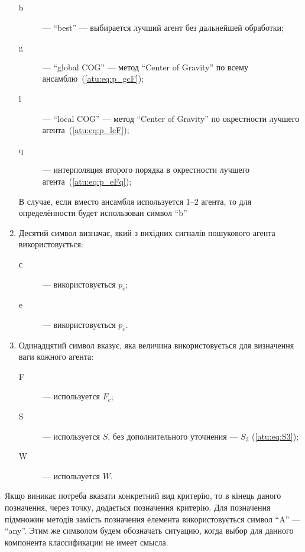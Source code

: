 \begin{enumerate}
\begin{description}
      \item[b]  --- ``best'' ---
        выбирается лучший агент без дальнейшей обработки;

      \item[g]  --- ``global COG'' ---
        метод ``Center of Gravity'' по всему ансамблю~(\ref{atu:eq:p_gcF});

      \item[l] --- ``local COG'' ---
        метод ``Center of Gravity'' по окрестности лучшего агента~(\ref{atu:eq:p_lcF});

      \item[q] ---
        интерполяция второго порядка в окрестности лучшего агента~(\ref{atu:eq:p_eFq});


    \end{description}

    В случае, если вместо ансамбля используется 1--2 агента, то для определённости будет
    использован символ ``b''


  \item
     Десятий символ визначає, який з вихідних сигналів пошукового агента використовується:
    \begin{description}

      \item[с]  ---  використовується $p_c$;

      \item[e]  --- використовується $p_e$.

    \end{description}

  \item
    Одинадцятий символ вказує,
    яка величина використовується для визначення ваги кожного агента:
    \begin{description}

      \item[F]  ---
        используется $F_c$;

      \item[S]  ---
        используется $S$, без дополнительного уточнения --- $S_{3}$ (\ref{atu:eq:S3});

      \item[W]  ---
        используется $W$.

    \end{description}


\end{enumerate}

Якщо виникає потреба вказати конкретний вид критерію, то в кінець даного
позначення, через точку, додається позначення критерію.
Для позначення підмножин методів замість позначення елемента використовується символ ``A'' --- ``any''.
%
Этим же символом будем обозначать ситуацию,
когда выбор для данного компонента классификации не имеет смысла.

